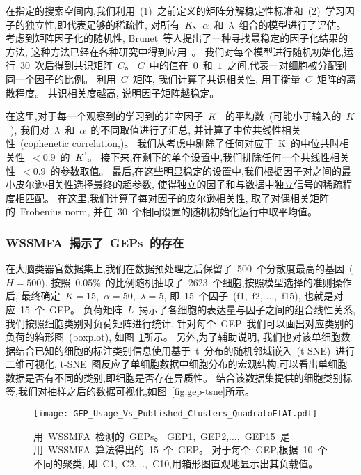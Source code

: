 在指定的搜索空间内,我们利用~(1)~之前定义的矩阵分解稳定性标准和~(2)~学习因子的独立性,即代表足够的稀疏性,
对所有~$K$、$\alpha$~和~$\lambda$~组合的模型进行了评估。
考虑到矩阵因子化的随机性, Brunet~等人提出了一种寻找最稳定的因子化结果的方法,
这种方法已经在各种研究中得到应用~\cite{brunet2004metagenes,wu2016stability}。
我们对每个模型进行随机初始化,运行~30~次后得到共识矩阵~$C$。
$C$~中的值在~$0$~和~$1$~之间,代表一对细胞被分配到同一个因子的比例。
利用~$C$~矩阵, 我们计算了共识相关性, 用于衡量~$C$~矩阵的离散程度。
共识相关度越高, 说明因子矩阵越稳定。

在这里,对于每一个观察到的学习到的非空因子~$K^\textup{'}$~的平均数~(可能小于输入的~$K$~),
我们对~$\lambda$~和~$\alpha$~的不同取值进行了汇总,
并计算了中位共线性相关性~(cophenetic correlation,\cite{brunet2004metagenes})。
我们从考虑中剔除了任何对应于~K~的中位共时相关性~$< 0.9$~的~$K^\textup{'}$。
接下来,在剩下的单个设置中,我们排除任何一个共线性相关性~$< 0.9$~的参数取值。
最后,在这些明显稳定的设置中,我们根据因子对之间的最小皮尔逊相关性选择最终的超参数,
使得独立的因子和与数据中独立信号的稀疏程度相匹配。
在这里,我们计算了每对因子的皮尔逊相关性, 取了对偶相关矩阵的~Frobenius norm, 
并在~30~个相同设置的随机初始化运行中取平均值。

\subsubsection{WSSMFA~揭示了~GEPs~的存在}
在大脑类器官数据集上,我们在数据预处理之后保留了~500~个分散度最高的基因~($H = 500$),
按照~0.05\%~的比例随机抽取了~2623~个细胞,按照模型选择的准则操作后,
最终确定~$K = 15$,~$\alpha = 50$,~$\lambda = 5$, 
即~15~个因子~(f1,~f2, $\ldots$,~f15), 也就是对应~15~个~GEP。
负荷矩阵~$L$~揭示了各细胞的表达量与因子之间的组合线性关系, 我们按照细胞类别对负荷矩阵进行统计,
针对每个~GEP~我们可以画出对应类别的负荷的箱形图~(boxplot), 如图~\ref{fig:gep-gep}所示。
另外,为了辅助说明, 我们也对该单细胞数据结合已知的细胞的标注类别信息使用基于~t~分布的随机邻域嵌入~(t-SNE)~进行二维可视化,
t-SNE~图反应了单细胞数据中细胞分布的宏观结构,可以看出单细胞数据是否有不同的类别,即细胞是否存在异质性。
结合该数据集提供的细胞类别标签,我们对抽样之后的数据可视化,如图~\ref{fig:gep-tsne}所示。

\begin{figure}[!htbp]
    \centering
    \texttt{[image: GEP\_Usage\_Vs\_Published\_Clusters\_QuadratoEtAI.pdf]}
    \caption{
    用~WSSMFA~检测的~GEPs。
    GEP1,~GEP2,$\ldots$,~GEP15~是用~WSSMFA~算法得出的~15~个~GEP。
    对于每个~GEP,根据~10~个不同的聚类,
    即~C1,~C2,$\ldots$,~C10,用箱形图直观地显示出其负载值。 
    }
    \label{fig:gep-gep}
\end{figure}


